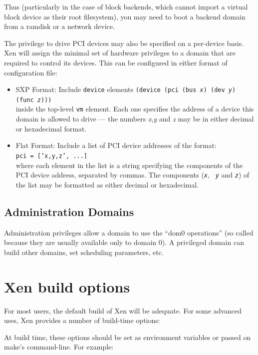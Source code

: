 \documentclass[11pt,twoside,final,openright]{xenstyle}
\begin{document}
Thus (particularly in the case of block backends, which cannot import
a virtual block device as their root filesystem), you may need to boot
a backend domain from a ramdisk or a network device.

The privilege to drive PCI devices may also be specified on a
per-device basis.  Xen will assign the minimal set of hardware
privileges to a domain that are required to control its devices.  This
can be configured in either format of configuration file:

\begin{itemize}
\item SXP Format:
  Include {\tt device} elements
  {\tt (device (pci (bus {\em x}) (dev {\em y}) (func {\em z}))) } \\
  inside the top-level {\tt vm} element.  Each one specifies the address
  of a device this domain is allowed to drive ---
  the numbers {\em x},{\em y} and {\em z} may be in either decimal or
  hexadecimal format.
\item Flat Format: Include a list of PCI device addresses of the
  format: \\ {\tt pci = ['x,y,z', ...] } \\ where each element in the
  list is a string specifying the components of the PCI device
  address, separated by commas.  The components ({\tt \em x}, {\tt \em
  y} and {\tt \em z}) of the list may be formatted as either decimal
  or hexadecimal.
\end{itemize}

\section{Administration Domains}

Administration privileges allow a domain to use the ``dom0
operations'' (so called because they are usually available only to
domain 0).  A privileged domain can build other domains, set scheduling
parameters, etc.


\chapter{Xen build options}

For most users, the default build of Xen will be adequate.  For some
advanced uses, Xen provides a number of build-time options:

At build time, these options should be set as environment variables or
passed on make's command-line.  For example:
\end{document}
